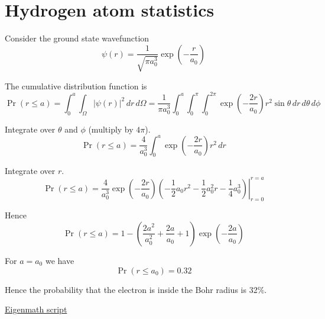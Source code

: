 

\section*{Hydrogen atom statistics}

Consider the ground state wavefunction
\begin{equation*}
\psi(r)=\frac{1}{\sqrt{\pi a_0^3}}\exp\left(-\frac{r}{a_0}\right)
\end{equation*}

The cumulative distribution function is
\begin{equation*}
\Pr(r\le a)
=\int_0^a\int_{\Omega}|\psi(r)|^2\,dr\,d\Omega
=\frac{1}{\pi a_0^3}
\int_0^a\int_0^\pi\int_0^{2\pi}\exp\left(-\frac{2r}{a_0}\right)
r^2\sin\theta\,dr\,d\theta\,d\phi
\end{equation*}

Integrate over $\theta$ and $\phi$ (multiply by $4\pi$).
\begin{equation*}
\Pr(r\le a)=\frac{4}{a_0^3}
\int_0^a\exp\left(-\frac{2r}{a_0}\right)r^2\,dr
\end{equation*}

Integrate over $r$.
\begin{equation*}
\Pr(r\le a)=\frac{4}{a_0^3}
\exp\left(-\frac{2r}{a_0}\right)
\left.
\left(-\frac{1}{2}a_0r^2-\frac{1}{2}a_0^2r-\frac{1}{4}a_0^3\right)
\right|_{r=0}^{r=a}
\end{equation*}

Hence
\begin{equation*}
\Pr(r\le a)=1-\left(\frac{2a^2}{a_0^2}+\frac{2a}{a_0}+1\right)
\exp\left(-\frac{2a}{a_0}\right)
\end{equation*}

For $a=a_0$ we have
\begin{equation*}
\Pr(r\le a_0)=0.32
\end{equation*}

Hence the probability that the electron is inside the Bohr radius is 32\%.

\bigskip
\href{https://georgeweigt.github.io/examples/hydrogen-atom-statistics-demo.html}{Eigenmath script}


